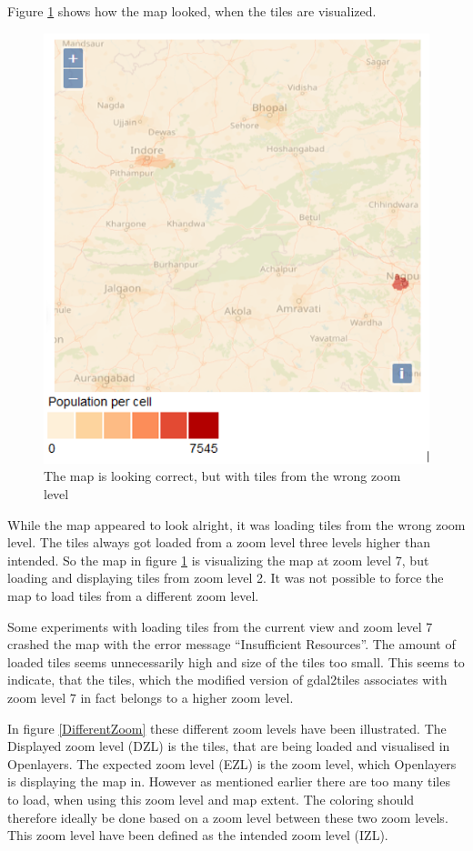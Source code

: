 Figure \ref{MapWithWrongResolution} shows how the map looked, when the tiles are visualized. 

\begin{figure} [H]
	\centering
	\includegraphics[width=.5\textwidth]{Pictures/MapWithWrongResolution}
	\caption{The map is looking correct, but with tiles from the wrong zoom level}
	\label{MapWithWrongResolution}
\end{figure}


While the map appeared to look alright, it was loading tiles from the wrong zoom level. The tiles always got loaded from a zoom level three levels higher than intended. So the map in figure \ref{MapWithWrongResolution} is visualizing the map at zoom level 7, but loading and displaying tiles from zoom level 2. It was not possible to force the map to load tiles from a different zoom level.

Some experiments with loading tiles from the current view and zoom level 7 crashed the map with the error message “Insufficient Resources”. The amount of loaded tiles seems unnecessarily high and size of the tiles too small. This seems to indicate, that the tiles, which the modified version of gdal2tiles associates with zoom level 7 in fact belongs to a higher zoom level.

In figure \ref{DifferentZoom} these different zoom levels have been illustrated. The Displayed zoom level (DZL) is the tiles, that are being loaded and visualised in Openlayers. The expected zoom level (EZL) is the zoom level, which Openlayers is displaying the map in. However as mentioned earlier there are too many tiles to load, when using this zoom level and map extent. The coloring should therefore ideally be done based on a zoom level between these two zoom levels. This zoom level have been defined as the intended zoom level (IZL).

